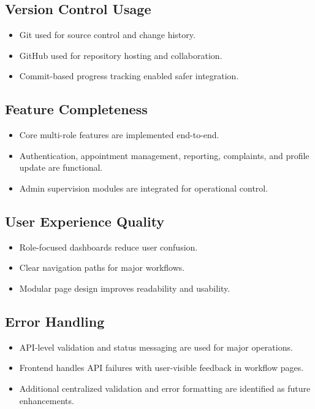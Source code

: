 \documentclass[12pt,a4paper]{article}
\begin{document}
\subsection{Version Control Usage}
\begin{itemize}[leftmargin=1.2cm]
    \item Git used for source control and change history.
    \item GitHub used for repository hosting and collaboration.
    \item Commit-based progress tracking enabled safer integration.
\end{itemize}

\subsection{Feature Completeness}
\begin{itemize}[leftmargin=1.2cm]
    \item Core multi-role features are implemented end-to-end.
    \item Authentication, appointment management, reporting, complaints, and profile update are functional.
    \item Admin supervision modules are integrated for operational control.
\end{itemize}

\subsection{User Experience Quality}
\begin{itemize}[leftmargin=1.2cm]
    \item Role-focused dashboards reduce user confusion.
    \item Clear navigation paths for major workflows.
    \item Modular page design improves readability and usability.
\end{itemize}

\subsection{Error Handling}
\begin{itemize}[leftmargin=1.2cm]
    \item API-level validation and status messaging are used for major operations.
    \item Frontend handles API failures with user-visible feedback in workflow pages.
    \item Additional centralized validation and error formatting are identified as future enhancements.
\end{itemize}
\end{document}
